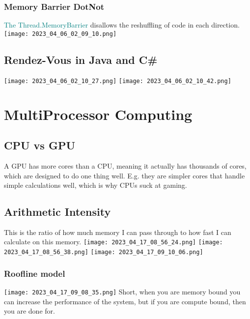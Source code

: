 \documentclass[main.tex,fontsize=8pt,paper=a4,paper=portrait,DIV=calc,]{scrartcl}
\begin{document}
\subsubsection{Memory Barrier DotNot}
\textcolor{teal}{The Thread.MemoryBarrier} disallows the reshuffling of code in each direction.\newline
\texttt{[image: 2023\_04\_06\_02\_09\_10.png]}

\subsection{Rendez-Vous in Java and C#}
\texttt{[image: 2023\_04\_06\_02\_10\_27.png]}
\texttt{[image: 2023\_04\_06\_02\_10\_42.png]}

\section{MultiProcessor Computing}
\subsection{CPU vs GPU}
A GPU has more cores than a CPU, meaning it actually has thousands of cores, which are designed to do one thing well.\newline
E.g. they are simpler cores that handle simple calculations well, which is why CPUs suck at gaming.\newline

\subsection{Arithmetic Intensity}
This is the ratio of how much memory I can pass through to how fast I can calculate on this memory.\newline
\texttt{[image: 2023\_04\_17\_08\_56\_24.png]}\newline
\texttt{[image: 2023\_04\_17\_08\_56\_38.png]}\newline 
\texttt{[image: 2023\_04\_17\_09\_10\_06.png]} 

\subsubsection{Roofline model}
\texttt{[image: 2023\_04\_17\_09\_08\_35.png]}\newline
Short, when you are memory bound you can increase the performance of the system, but if you are compute bound, then you are done for.
\end{document}
